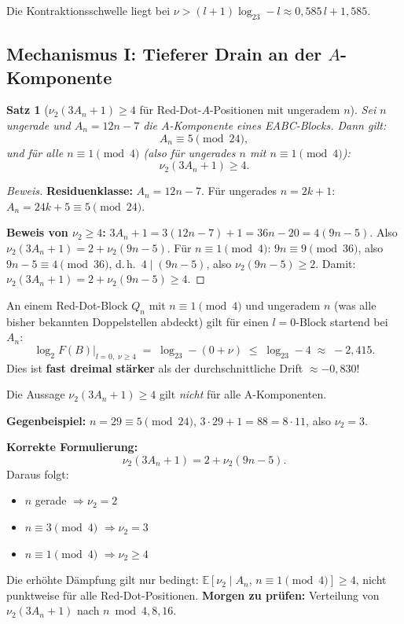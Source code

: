 \documentclass[12pt,a4paper]{article}
\newtheorem{satz}[definition]{Satz}
\newenvironment{beweis}{\begin{proof}[Beweis]}{\end{proof}}
\newcommand{\vii}{\nu_2}
\newcommand{\logt}{\log_2}
\begin{document}
Die Kontraktionsschwelle liegt bei $\nu > (l+1)\logt 3 - l \approx 0{,}585\,l + 1{,}585$.

\subsection{Mechanismus I: Tieferer Drain an der \texorpdfstring{$A$}{A}-Komponente}

\begin{satz}[$\vii(3A_n+1) \geq 4$ für Red-Dot-$A$-Positionen mit ungeradem $n$]
\label{satz:nu_geq_4}
Sei $n$ ungerade und $A_n = 12n-7$ die $A$-Komponente eines EABC-Blocks.
Dann gilt:
\[
  A_n \equiv 5 \pmod{24},
\]
und für alle $n \equiv 1 \pmod{4}$ (also für ungerades $n$ mit $n \equiv 1 \pmod 4$):
\[
  \vii(3A_n + 1) \geq 4.
\]
\end{satz}

\begin{beweis}
\textbf{Residuenklasse:}
$A_n = 12n - 7$. Für ungerades $n = 2k+1$: $A_n = 24k + 5 \equiv 5 \pmod{24}$.

\textbf{Beweis von $\vii \geq 4$:}
$3A_n + 1 = 3(12n-7) + 1 = 36n - 20 = 4(9n - 5)$.
Also $\vii(3A_n+1) = 2 + \vii(9n-5)$.
Für $n \equiv 1 \pmod{4}$: $9n \equiv 9 \pmod{36}$, also $9n - 5 \equiv 4 \pmod{36}$,
d.\,h.\ $4 \mid (9n-5)$, also $\vii(9n-5) \geq 2$.
Damit: $\vii(3A_n+1) = 2 + \vii(9n-5) \geq 4$.
\end{beweis}

\begin{tcolorbox}[reddot, title={Red-Dot-Kontraktionsbonus (Mechanismus I)}]
An einem Red-Dot-Block $Q_n$ mit $n \equiv 1 \pmod 4$ und ungeradem $n$
(was alle bisher bekannten Doppelstellen abdeckt) gilt für einen
$l=0$-Block startend bei $A_n$:
\[
  \logt F(B)\big|_{l=0,\;\nu\geq 4}
  \;=\; \logt 3 - (0 + \nu)
  \;\leq\; \logt 3 - 4
  \;\approx\; -2{,}415.
\]
Dies ist \textbf{fast dreimal stärker} als der durchschnittliche Drift
$\approx -0{,}830$!
\end{tcolorbox}

\begin{tcolorbox}[colback=red!8, colframe=red!70!black, fonttitle=\bfseries,
  title={[!]\; Korrektur: Keine deterministische $\nu_2 \geq 4$-Schranke}]
Die Aussage $\nu_2(3A_n+1) \geq 4$ gilt \emph{nicht} für alle A-Komponenten.

\textbf{Gegenbeispiel:} $n=29 \equiv 5 \pmod{24}$, $3\cdot 29+1=88=8\cdot 11$, also $\nu_2=3$.

\textbf{Korrekte Formulierung:}
\[
\nu_2(3A_n+1) = 2 + \nu_2(9n-5).
\]
Daraus folgt:
\begin{itemize}
\item $n$ gerade $\Rightarrow \nu_2=2$
\item $n \equiv 3 \pmod{4}$ $\Rightarrow \nu_2=3$
\item $n \equiv 1 \pmod{4}$ $\Rightarrow \nu_2 \geq 4$
\end{itemize}
Die erhöhte Dämpfung gilt nur bedingt:
$\mathbb{E}[\nu_2 \mid A_n,\, n \equiv 1\pmod{4}] \geq 4$,
nicht punktweise für alle Red-Dot-Positionen.
\textbf{Morgen zu prüfen:} Verteilung von $\nu_2(3A_n+1)$ nach $n \bmod 4, 8, 16$.
\end{tcolorbox}
\end{document}
